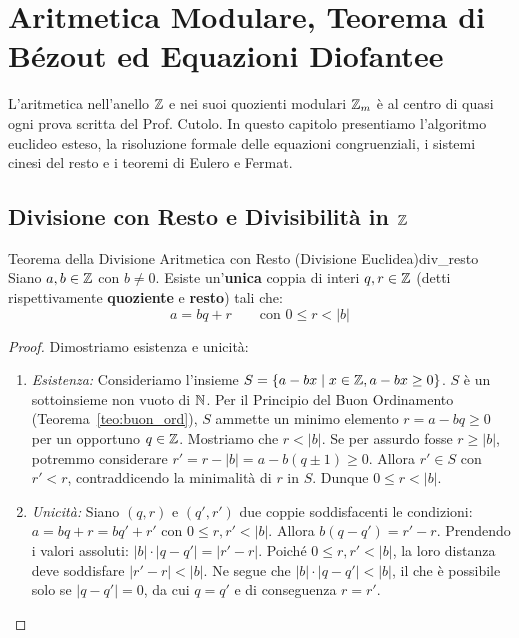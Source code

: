 \chapter{Aritmetica Modulare, Teorema di Bézout ed Equazioni Diofantee}
\label{chap:aritmetica}

L'aritmetica nell'anello $\mathbb{Z}$ e nei suoi quozienti modulari $\mathbb{Z}_m$ è al centro di quasi ogni prova scritta del Prof. Cutolo. In questo capitolo presentiamo l'algoritmo euclideo esteso, la risoluzione formale delle equazioni congruenziali, i sistemi cinesi del resto e i teoremi di Eulero e Fermat.

\section{Divisione con Resto e Divisibilità in $\mathbb{Z}$}

\begin{teorema}{Teorema della Divisione Aritmetica con Resto (Divisione Euclidea)}{div_resto}
Siano $a, b \in \mathbb{Z}$ con $b \neq 0$. Esiste un'\textbf{unica} coppia di interi $q, r \in \mathbb{Z}$ (detti rispettivamente \textbf{quoziente} e \textbf{resto}) tali che:
\[
    a = bq + r \qquad \text{con } 0 \le r < |b|
\]
\end{teorema}

\begin{proof}
Dimostriamo esistenza e unicità:
\begin{enumerate}
    \item \emph{Esistenza:} Consideriamo l'insieme $S = \{a - bx \mid x \in \mathbb{Z}, a - bx \ge 0\}$.
    $S$ è un sottoinsieme non vuoto di $\mathbb{N}$. Per il Principio del Buon Ordinamento (Teorema~\ref{teo:buon_ord}), $S$ ammette un minimo elemento $r = a - bq \ge 0$ per un opportuno $q \in \mathbb{Z}$.
    Mostriamo che $r < |b|$. Se per assurdo fosse $r \ge |b|$, potremmo considerare $r' = r - |b| = a - b(q \pm 1) \ge 0$. Allora $r' \in S$ con $r' < r$, contraddicendo la minimalità di $r$ in $S$. Dunque $0 \le r < |b|$.
    \item \emph{Unicità:} Siano $(q, r)$ e $(q', r')$ due coppie soddisfacenti le condizioni: $a = bq + r = bq' + r'$ con $0 \le r, r' < |b|$.
    Allora $b(q - q') = r' - r$. Prendendo i valori assoluti: $|b| \cdot |q - q'| = |r' - r|$.
    Poiché $0 \le r, r' < |b|$, la loro distanza deve soddisfare $|r' - r| < |b|$.
    Ne segue che $|b| \cdot |q - q'| < |b|$, il che è possibile solo se $|q - q'| = 0$, da cui $q = q'$ e di conseguenza $r = r'$.
\end{enumerate}
\end{proof}


